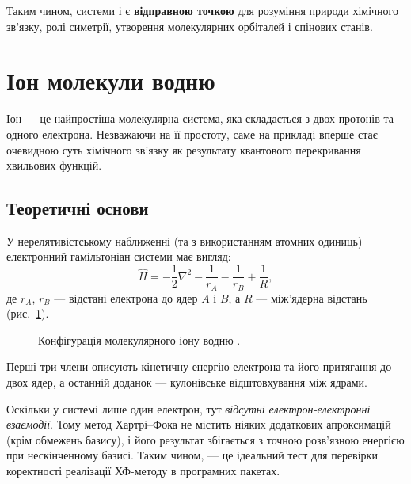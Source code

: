 Таким чином, системи  і  є \textbf{відправною точкою}
для розуміння природи хімічного зв’язку, ролі симетрії,
утворення молекулярних орбіталей і спінових станів.

\section{Іон молекули водню }

Іон  --- це найпростіша молекулярна система, яка складається з двох протонів
та одного електрона. Незважаючи на її простоту, саме на прикладі 
вперше стає очевидною суть хімічного зв’язку як результату
квантового перекривання хвильових функцій.
\subsection{Теоретичні основи}


У нерелятивістському наближенні (та з використанням атомних одиниць)
електронний гамільтоніан системи має вигляд:
\[
	\hat{H} = -\frac{1}{2}\nabla^2 - \frac{1}{r_A} - \frac{1}{r_B} + \frac{1}{R},
\]
де $r_A$, $r_B$ --- відстані електрона до ядер $A$ і $B$,
а $R$ --- між'ядерна відстань (рис.~\ref{tikz:H2Ion}).


\begin{figure}[h!]\centering
	
	\caption{Конфігурація молекулярного іону водню .}
	\label{tikz:H2Ion}
\end{figure}

Перші три члени описують кінетичну енергію електрона
та його притягання до двох ядер, а останній доданок --- кулонівське
відштовхування між ядрами.

Оскільки у системі лише один електрон, тут \emph{відсутні електрон-елек\-трон\-ні взаємодії}.
Тому метод Хартрі--Фока не містить ніяких додаткових апроксимацій (крім обмежень базису),
і його результат збігається з точною розв’язною енергією при нескінченному базисі.
Таким чином,  --- це ідеальний тест для перевірки
коректності реалізації ХФ-методу в програмних пакетах.

